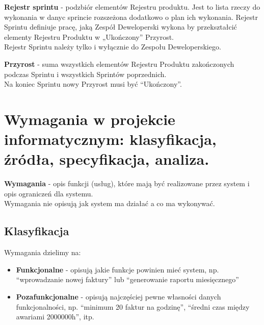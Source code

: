 \documentclass[12pt]{article}
\begin{document}
    \begin{definition}
    \textbf{Rejestr sprintu} - podzbiór elementów Rejestru produktu. Jest to lista rzeczy do wykonania w danyc sprincie rozszeżona dodatkowo o plan ich wykonania.
    Rejestr Sprintu definiuje pracę, jaką Zespół Deweloperski wykona by przekształcić elementy Rejestru Produktu w „Ukończony” Przyrost. \\
    Rejestr Sprintu należy tylko i wyłącznie do Zespołu Deweloperskiego.
    \end{definition}
    
    \begin{definition}
    \textbf{Przyrost} - suma wszystkich elementów Rejestru Produktu zakończonych podczas Sprintu i wszystkich Sprintów poprzednich. \\
    Na koniec Sprintu nowy Przyrost musi być ``Ukończony''.
    \end{definition}
    
    \newpage
    
    
    
    
    \section{Wymagania w projekcie informatycznym: klasyfikacja, źródła, specyfikacja, analiza.}
    
    \begin{definition}
    \textbf{Wymagania} - opis funkcji (usług), które mają być realizowane przez system i opis ograniczeń dla systemu. \\
    Wymagania nie opisują jak system ma działać a co ma wykonywać.
    \end{definition}
    
    \subsection{Klasyfikacja}
    
    \begin{definition}
    Wymagania dzielimy na:
    \begin{itemize}
        \item \textbf{Funkcjonalne} - opisują jakie funkcje powinien mieć system, np. ``wprowadzanie nowej faktury'' lub ``generowanie raportu miesięcznego''
        \item \textbf{Pozafunkcjonalne} - opisują najczęściej pewne własności danych funkcjonalności, np. ``minimum 20 faktur na godzinę'', ``średni czas między awariami 2000000h'', itp.
    \end{itemize}
    \end{definition}
    
\end{document}
